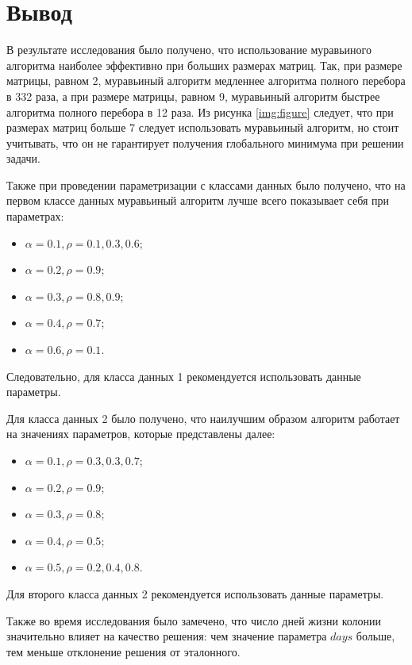 \section*{Вывод}

В результате исследования было получено, что использование муравьиного алгоритма наиболее эффективно при больших размерах матриц. Так, при размере матрицы, равном 2, муравьиный алгоритм медленнее алгоритма полного перебора в 332 раза, а при размере матрицы, равном 9, муравьиный алгоритм быстрее алгоритма полного перебора в 12 раза. Из рисунка \ref{img:figure} следует, что при размерах матриц больше 7 следует использовать муравьиный алгоритм, но стоит учитывать, что он не гарантирует получения глобального минимума при решении задачи.

Также при проведении параметризации с классами данных было получено, что на первом классе данных муравьиный алгоритм лучше всего показывает себя при параметрах:
\begin{itemize}[label=---]
	\item $\alpha = 0.1, \rho = 0.1, 0.3, 0.6$;
	\item $\alpha = 0.2, \rho = 0.9$;
	\item $\alpha = 0.3, \rho = 0.8, 0.9$;
	\item $\alpha = 0.4, \rho = 0.7$;
	\item $\alpha = 0.6, \rho = 0.1$.
\end{itemize}  
Следовательно, для класса данных 1 рекомендуется использовать данные параметры. 

Для класса данных 2 было получено, что наилучшим образом алгоритм работает на значениях параметров, которые представлены далее:
\begin{itemize}[label=---]
	\item $\alpha = 0.1, \rho = 0.3, 0.3, 0.7$;
	\item $\alpha = 0.2, \rho = 0.9$;
	\item $\alpha = 0.3, \rho = 0.8$;
	\item $\alpha = 0.4, \rho = 0.5$;
	\item $\alpha = 0.5, \rho = 0.2, 0.4, 0.8$.
\end{itemize} 
Для второго класса данных 2 рекомендуется использовать данные параметры.

Также во время исследования было замечено, что число дней жизни колонии значительно влияет на качество решения: чем значение параметра $days$ больше, тем меньше отклонение решения от эталонного.


